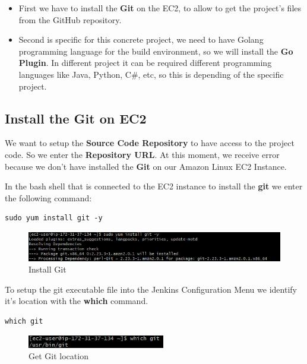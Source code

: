 \documentclass[12pt,a4paper,twoside]{article}
\begin{document}
\begin{itemize}
	\item First we have to install the \textbf{Git} on the EC2, to allow to get the project's files from the GitHub repository.

	\item Second is specific for this concrete project, we need to have Golang programming language for the build environment, so we will install the \textbf{Go Plugin}. In different project it can be required different programming languages like Java, Python, C\#, etc, so this is depending of the specific project.
\end{itemize}


\subsection{Install the Git on EC2}


We want to setup the \textbf{Source Code Repository} to have access to the project code. So we enter the \textbf{Repository URL}.
At this moment, we receive error because we don't have installed the \textbf{Git} on our  Amazon Linux EC2 Instance.


In the bash shell that is connected to the EC2 instance to install the \textbf{git} we enter the following command:


\begin{verbatim}
sudo yum install git -y
\end{verbatim}


\begin{figure}[H]
    \centering
        \includegraphics[width=15cm]{images-aws/27-jenkins-install-git.png}
        \caption{Install Git}
\end{figure}


To setup the git executable file into the Jenkins Configuration Menu we identify it's location with the \textbf{which} command.


\begin{verbatim}
which git
\end{verbatim}


\begin{figure}[H]
    \centering
        \includegraphics[width=6cm]{images-aws/28-jenkins-git-on-local.png}
        \caption{Get Git location}
\end{figure}
\end{document}
